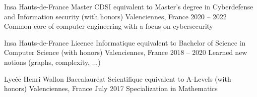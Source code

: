 
\begin{cventries}
  \cventry
    {Insa Hauts-de-France} %
    {Master CDSI equivalent to Master's degree in Cyberdefense and Information security (with honors)} %
    {Valenciennes, France} %
    {2020 – 2022} %
    {Common core of computer engineering with a focus on cybersecurity}
    
  \cventry
    {Insa Hauts-de-France} %
    {Licence Informatique equivalent to Bachelor of Science in Computer Science (with honors)} %
    {Valenciennes, France} %
    {2018 – 2020} %
    {Learned new notions (graphs, complexity, ...)}

  \cventry
    {Lycée Henri Wallon} %
    {Baccalauréat Scientifique equivalent to A-Levels (with honors)} %
    {Valenciennes, France} %
    {July 2017} %
    {Specialization in Mathematics}
\end{cventries}
